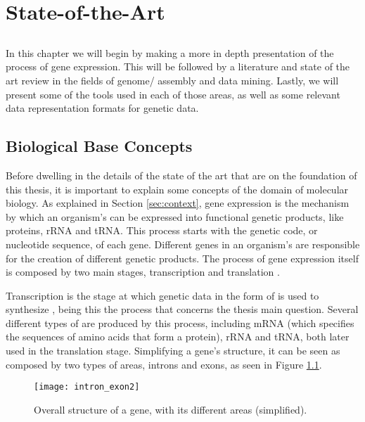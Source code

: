 \chapter{State-of-the-Art} \label{chap:sota}

\section*{}

In this chapter we will begin by making a more in depth presentation of the
process of gene expression. This will be followed by a literature and state of
the art review in the fields of genome/\trans{} assembly and data mining.
Lastly, we will present some of the tools used in each of those areas, as well
as some relevant data representation formats for genetic data.

\section{Biological Base Concepts}

Before dwelling in the details of the state of the art that are on the
foundation of this thesis, it is important to explain some concepts of the
domain of molecular biology. As explained in Section \ref{sec:context}, gene
expression is the mechanism by which an organism's \dna{} can be expressed into
functional genetic products, like proteins, rRNA and tRNA. This process starts
with the genetic code, or nucleotide sequence, of each gene. Different genes in
an organism's \dna{} are responsible for the creation of different genetic
products. The process of gene expression itself is composed by two main stages,
transcription and translation \cite{leic:gene_expr}.

Transcription is the stage at which genetic data in the form of \dna{} is used
to synthesize \rna{}, being this the process that concerns the thesis main
question. Several different types of \rna{} are produced by this process,
including mRNA (which specifies the sequences of amino acids that form a
protein), rRNA and tRNA, both later used in the translation stage. Simplifying a
gene's structure, it can be seen as composed by two types of areas, introns and
exons, as seen in Figure \ref{fig:intron_exon}.

\begin{figure}[!htb]
  \begin{center}
    \leavevmode
    \texttt{[image: intron\_exon2]}
    \caption[Overall structure of a gene]{Overall structure of a gene, with its
    different areas (simplified).}
    \label{fig:intron_exon}
  \end{center}
\end{figure}

